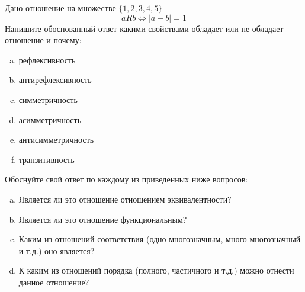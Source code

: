 \question
Дано отношение на множестве $\{1, 2, 3, 4, 5\}$ 
\begin{equation*}
aRb \iff |a-b| = 1
\end{equation*}
Напишите обоснованный ответ какими свойствами обладает или не обладает отношение и почему:   
\begin{enumerate} [a)]\setcounter{enumi}{0}
\item рефлексивность
\item антирефлексивность
\item симметричность
\item асимметричность
\item антисимметричность
\item транзитивность
\end{enumerate}

Обоснуйте свой ответ по каждому из приведенных ниже вопросов:
\begin{enumerate} [a)]\setcounter{enumi}{0}
    \item Является ли это отношение отношением эквивалентности?
    \item Является ли это отношение функциональным?
    \item Каким из отношений соответствия (одно-многозначным, много-многозначный и т.д.) оно является?
    \item К каким из отношений порядка (полного, частичного и т.д.) можно отнести данное отношение?
\end{enumerate}

